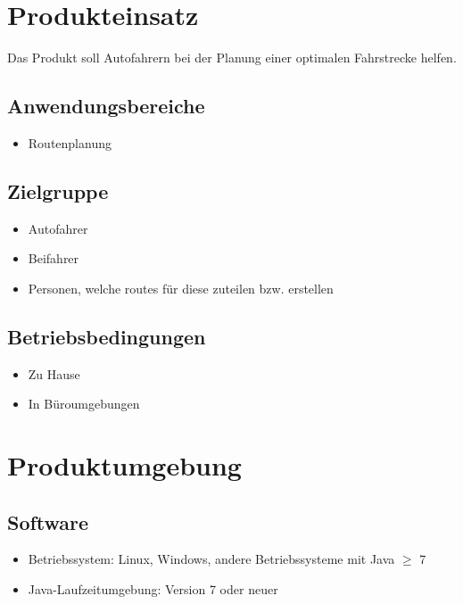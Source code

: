 \documentclass[a4paper, 11pt]{article}
\begin{document}
\section{Produkteinsatz}

Das Produkt soll Autofahrern bei der Planung einer optimalen Fahrstrecke helfen.

\subsection{Anwendungsbereiche}
\begin{itemize}
\item Routenplanung
\end{itemize}

\subsection{Zielgruppe}
\begin{itemize}
\item Autofahrer
\item Beifahrer
\item Personen, welche \glspl{route} für diese zuteilen bzw. erstellen
\end{itemize}

\subsection{Betriebsbedingungen}
\begin{itemize}
\item Zu Hause
\item In Büroumgebungen
\end{itemize}

\section{Produktumgebung}

\subsection{Software}\label{subsec:Software}

\begin{itemize}
\item Betriebssystem: Linux, Windows, andere Betriebssysteme mit Java $\geq$ 7
\item Java-Laufzeitumgebung: Version 7 oder neuer
\end{itemize}
\end{document}
